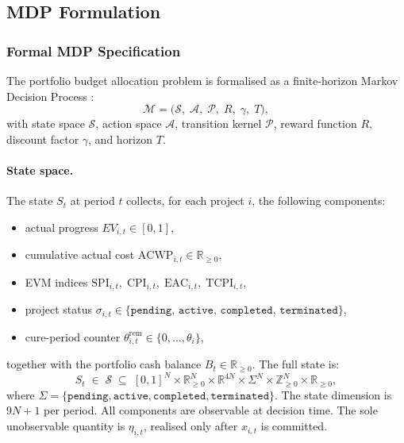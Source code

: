 \subsection{MDP Formulation}
\label{subsec:mdp}

\subsubsection{Formal MDP Specification}
\label{subsubsec:mdp_def}

\begin{definition}
\label{def:mdp}
The portfolio budget allocation problem is formalised as a
finite-horizon Markov Decision Process \citep{Puterman1994}:
\begin{equation}
  \mathcal{M} = \bigl(\mathcal{S},\;\mathcal{A},\;
    \mathcal{P},\;R,\;\gamma,\;T\bigr),
  \label{eq:mdp_tuple}
\end{equation}
with state space $\mathcal{S}$, action space $\mathcal{A}$, transition
kernel $\mathcal{P}$, reward function $R$, discount factor $\gamma$,
and horizon $T$.
\end{definition}

\paragraph{State space.}
The state $S_t$ at period $t$ collects, for each project $i$, the
following components:
\begin{itemize}[nosep]
  \item actual progress $EV_{i,t} \in [0,1]$,
  \item cumulative actual cost $\mathrm{ACWP}_{i,t} \in \mathbb{R}_{\geq 0}$,
  \item EVM indices $\mathrm{SPI}_{i,t},\; \mathrm{CPI}_{i,t},\;
        \mathrm{EAC}_{i,t},\; \mathrm{TCPI}_{i,t}$,
  \item project status $\sigma_{i,t} \in \{\texttt{pending},\,
        \texttt{active},\, \texttt{completed},\, \texttt{terminated}\}$,
  \item cure-period counter $\theta^{\mathrm{rem}}_{i,t} \in
        \{0, \ldots, \theta_i\}$,
\end{itemize}
together with the portfolio cash balance $B_t \in \mathbb{R}_{\geq 0}$.
The full state is:
\begin{equation}
  S_t \;\in\; \mathcal{S}
  \;\subseteq\; [0,1]^N \times \mathbb{R}^N_{\geq 0}
    \times \mathbb{R}^{4N} \times \Sigma^N
    \times \mathbb{Z}^N_{\geq 0} \times \mathbb{R}_{\geq 0},
  \label{eq:state_space}
\end{equation}
where $\Sigma = \{\texttt{pending},\texttt{active},\texttt{completed},
\texttt{terminated}\}$. The state dimension is $9N+1$ per period.
All components are observable at decision time. The sole unobservable
quantity is $\eta_{i,t}$, realised only after $x_{i,t}$ is committed.

